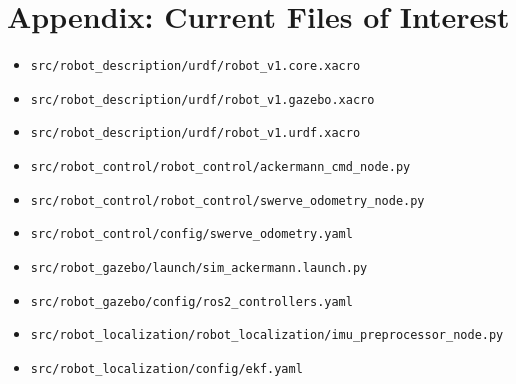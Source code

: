 \documentclass[12pt,a4paper]{report}
\begin{document}
\chapter*{Appendix: Current Files of Interest}
\begin{itemize}[leftmargin=*]
  \item \texttt{src/robot\_description/urdf/robot\_v1.core.xacro}
  \item \texttt{src/robot\_description/urdf/robot\_v1.gazebo.xacro}
  \item \texttt{src/robot\_description/urdf/robot\_v1.urdf.xacro}
  \item \texttt{src/robot\_control/robot\_control/ackermann\_cmd\_node.py}
  \item \texttt{src/robot\_control/robot\_control/swerve\_odometry\_node.py}
  \item \texttt{src/robot\_control/config/swerve\_odometry.yaml}
  \item \texttt{src/robot\_gazebo/launch/sim\_ackermann.launch.py}
  \item \texttt{src/robot\_gazebo/config/ros2\_controllers.yaml}
  \item \texttt{src/robot\_localization/robot\_localization/imu\_preprocessor\_node.py}
  \item \texttt{src/robot\_localization/config/ekf.yaml}
\end{itemize}
\end{document}
